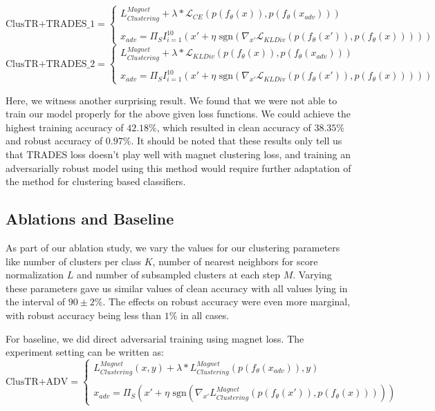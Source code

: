 \[\text{ClusTR+TRADES\_1} = \begin{cases}L^{Magnet}_{Clustering} + \lambda*\mathcal{L}_{CE}(p(f_{\theta}(x)), p(f_{\theta}(x_{adv})))\\
\\
x_{adv} = \Pi_{S}I_{i=1}^{10}(x' + \eta \text{ sgn}(\nabla_{x'}\mathcal{L}_{KLDiv}(p(f_{\theta}(x')), p(f_{\theta}(x)))))\end{cases}\]
\medskip
\[\text{ClusTR+TRADES\_2} = \begin{cases}L^{Magnet}_{Clustering} + \lambda*\mathcal{L}_{KLDiv}(p(f_{\theta}(x)), p(f_{\theta}(x_{adv})))\\
\\
x_{adv} = \Pi_{S}I_{i=1}^{10}(x' + \eta \text{ sgn}(\nabla_{x'}\mathcal{L}_{KLDiv}(p(f_{\theta}(x')), p(f_{\theta}(x)))))\end{cases}\]

Here, we witness another surprising result. We found that we were not able to train our model properly for the above given loss functions. We could achieve the highest training accuracy of $42.18\%$, which resulted in clean accuracy of $38.35\%$ and robust accuracy of $0.97\%$. It should be noted that these results only tell us that TRADES loss doesn't play well with magnet clustering loss, and training an adversarially robust model using this method would require further adaptation of the method for clustering based classifiers.

\subsection{Ablations and Baseline}
As part of our ablation study, we vary the values for our clustering parameters like number of clusters per class $K$, number of nearest neighbors for score normalization $L$ and number of subsampled clusters at each step $M$. Varying these parameters gave us similar values of clean accuracy with all values lying in the interval of $90\pm 2\%$. The effects on robust accuracy were even more marginal, with robust accuracy being less than $1\%$ in all cases.

For baseline, we did direct adversarial training using magnet loss. The experiment setting can be written as:
\[\text{ClusTR+ADV} = \begin{cases}L^{Magnet}_{Clustering}(x,y) + \lambda*L^{Magnet}_{Clustering}(p(f_{\theta}(x_{adv})), y)\\
\\
x_{adv} = \Pi_{S}(x' + \eta \text{ sgn}(\nabla_{x'}L^{Magnet}_{Clustering}(p(f_{\theta}(x')), p(f_{\theta}(x)))))\end{cases}\]


